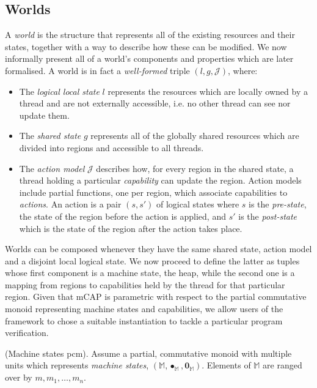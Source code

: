 \subsection{Worlds} \label{worlds}

A \textit{world} is the structure that represents all of the existing resources and their states, together with a way to describe how these can be modified. We now informally present all of a world's components and properties which are later formalised. A world is in fact a \textit{well-formed} triple $(l, g, \mathcal{J})$, where:
\begin{itemize}
	\item The \textit{logical local state} $l$ represents the resources which are locally owned by a thread and are not externally accessible, i.e. no other thread can see nor update them.
	\item The \textit{shared state} $g$ represents all of the globally shared resources which are divided into regions and accessible to all threads.
	\item The \textit{action model} $\mathcal{J}$ describes how, for every region in the shared state, a thread holding a particular \textit{capability} can update the region. Action models include partial functions, one per region, which associate capabilities to \textit{actions}. An action is a pair $(s, s')$ of logical states where $s$ is the \textit{pre-state}, the state of the region before the action is applied, and $s'$ is the \textit{post-state} which is the state of the region after the action takes place.
\end{itemize}

Worlds can be composed whenever they have the same shared state, action model and a disjoint local logical state. We now proceed to define the latter as tuples whose first component is a machine state, the heap, while the second one is a mapping from regions to capabilities held by the thread for that particular region. Given that mCAP is parametric with respect to the partial commutative monoid representing machine states and capabilities, we allow users of the framework to chose a suitable instantiation to tackle a particular program verification.

\begin{param}
	\label{param:machineStates}
	(Machine states pcm).
	Assume a partial, commutative monoid with multiple units which represents \emph{machine states}, $(\mathbb{M}, \bullet_\mathbb{M}, \mathbf{0}_\mathbb{M})$. Elements of $\mathbb{M}$ are ranged over by $m, m_1, \ldots, m_n$.
\end{param}

